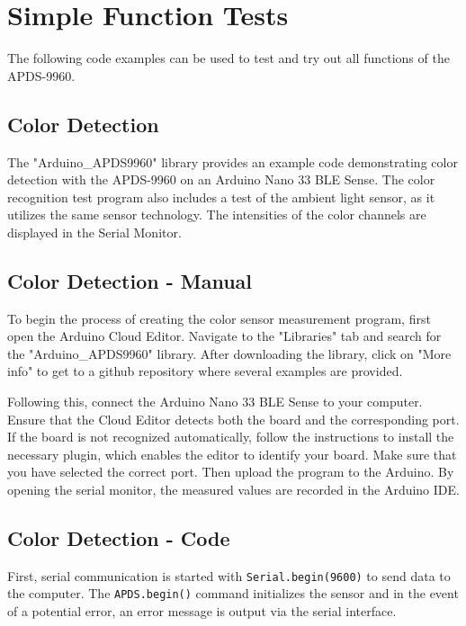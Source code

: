 \cite{ArduinoAPDS9960:2024}


\section{Simple Function Tests}

The following code examples can be used to test and try out all functions of the APDS-9960.

\subsection{Color Detection}

The "Arduino\_APDS9960" library provides an example code demonstrating color detection with the APDS-9960 on an Arduino Nano 33 BLE Sense. The color recognition test program also includes a test of the ambient light sensor, as it utilizes the same sensor technology. The intensities of the color channels are displayed in the Serial Monitor.



\subsection{Color Detection - Manual}

To begin the process of creating the color sensor measurement program, first open the Arduino Cloud Editor. Navigate to the "Libraries" tab and search for the "Arduino\_APDS9960" library. After downloading the library, click on "More info" to get to a github repository where several examples are provided.

Following this, connect the Arduino Nano 33 BLE Sense to your computer. Ensure that the Cloud Editor detects both the board and the corresponding port. If the board is not recognized automatically, follow the instructions to install the necessary plugin, which enables the editor to identify your board. Make sure that you have selected the correct port. Then upload the program to the Arduino. By opening the serial monitor, the measured values are recorded in the Arduino IDE.

\subsection{Color Detection - Code}

First, serial communication is started with \texttt{Serial.begin(9600)} to send data to the computer. The \texttt{APDS.begin()} command initializes the sensor and in the event of a potential error, an error message is output via the serial interface.

